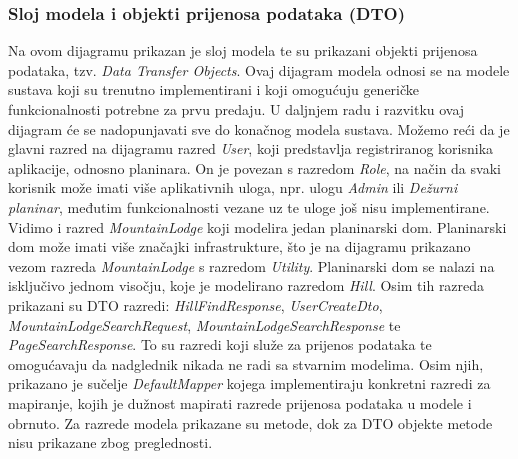 			\subsubsection{Sloj modela i objekti prijenosa podataka (DTO)}
			Na ovom dijagramu prikazan je sloj modela te su prikazani objekti prijenosa podataka, tzv. \textit{Data Transfer Objects}. Ovaj dijagram modela odnosi se na modele sustava koji su trenutno implementirani i koji omogućuju generičke funkcionalnosti potrebne za prvu predaju. U daljnjem radu i razvitku ovaj dijagram će se nadopunjavati sve do konačnog modela sustava. Možemo reći da je glavni razred na dijagramu razred \textit{User}, koji predstavlja registriranog korisnika aplikacije, odnosno planinara. On je povezan s razredom \textit{Role}, na način da svaki korisnik može imati više aplikativnih uloga, npr. ulogu \textit{Admin} ili \textit{Dežurni planinar}, međutim funkcionalnosti vezane uz te uloge još nisu implementirane. Vidimo i razred \textit{MountainLodge} koji modelira jedan planinarski dom. Planinarski dom može imati više značajki infrastrukture, što je na dijagramu prikazano vezom razreda \textit{MountainLodge} s razredom \textit{Utility}. Planinarski dom se nalazi na isključivo jednom visočju, koje je modelirano razredom \textit{Hill}. Osim tih razreda prikazani su DTO razredi: \textit{HillFindResponse}, \textit{UserCreateDto}, \textit{MountainLodgeSearchRequest}, \textit{MountainLodgeSearchResponse} te \textit{PageSearchResponse}. To su razredi koji služe za prijenos podataka te omogućavaju da nadglednik nikada ne radi sa stvarnim modelima. Osim njih, prikazano je sučelje \textit{DefaultMapper} kojega implementiraju konkretni razredi za mapiranje, kojih je dužnost mapirati razrede prijenosa podataka u modele i obrnuto. Za razrede modela prikazane su metode, dok za DTO objekte metode nisu prikazane zbog preglednosti.

